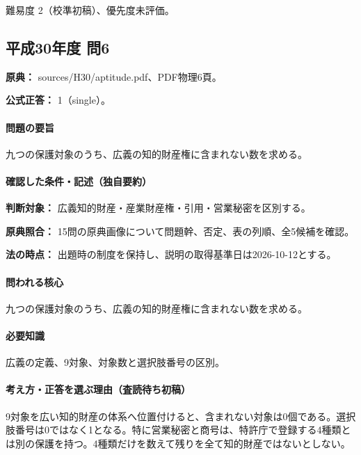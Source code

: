 \par 難易度 2（校準初稿）、優先度未評価。

\subsection{平成30年度 問6}
\label{q:h30-reg-apt-06}

\noindent\textbf{原典：} sources/H30/aptitude.pdf、PDF物理6頁。

\textbf{公式正答：} 1（single）。

\paragraph{問題の要旨} 九つの保護対象のうち、広義の知的財産権に含まれない数を求める。

\paragraph{確認した条件・記述（独自要約）}\mbox{}\par

\noindent\textbf{判断対象：} 広義知的財産・産業財産権・引用・営業秘密を区別する。\par

\noindent\textbf{原典照合：} 15問の原典画像について問題幹、否定、表の列順、全5候補を確認。\par

\noindent\textbf{法の時点：} 出題時の制度を保持し、説明の取得基準日は2026-10-12とする。\par

\paragraph{問われる核心} 九つの保護対象のうち、広義の知的財産権に含まれない数を求める。

\paragraph{必要知識} 広義の定義、9対象、対象数と選択肢番号の区別。

\paragraph{考え方・正答を選ぶ理由（査読待ち初稿）} 9対象を広い知的財産の体系へ位置付けると、含まれない対象は0個である。選択肢番号は0ではなく1となる。特に営業秘密と商号は、特許庁で登録する4種類とは別の保護を持つ。4種類だけを数えて残りを全て知的財産ではないとしない。

